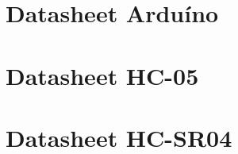 \chapter{Datasheet Arduíno}
\label{ArduinoAnexo}




\chapter{Datasheet HC-05}
\label{Anexo}


%

%



\chapter{Datasheet HC-SR04}
\label{SensorAnexo}

